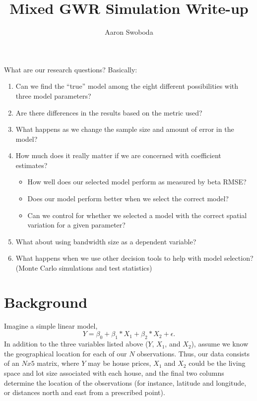 \documentclass{article}\usepackage[]{graphicx}\usepackage[]{color}
\title{Mixed GWR Simulation Write-up}
\author{Aaron Swoboda}
\begin{document}
\maketitle

What are our research questions? Basically:
\begin{enumerate}
\item Can we find the ``true'' model among the eight different possibilities with three model parameters?
\item Are there differences in the results based on the metric used?
\item What happens as we change the sample size and amount of error in the model?
\item How much does it really matter if we are concerned with coefficient estimates?
  \begin{itemize}
  \item How well does our selected model perform as measured by beta RMSE?
  \item Does our model perform better when we select the correct model?
  \item Can we control for whether we selected a model with the correct spatial variation for a given parameter?
  \end{itemize}
\item What about using bandwidth size as a dependent variable?
\item What happens when we use other decision tools to help with model selection? (Monte Carlo simulations and test statistics)
\end{enumerate}




\section{Background}

Imagine a simple linear model,
\begin{equation}\label{eq:simpleOLS}
Y = \beta _0 + \beta _1 *X_1 + \beta _2 * X_2 + \epsilon .
\end{equation}
In addition to the three variables listed above ($Y$, $X_1$, and $X_2$), assume we know the geographical location for each of our $N$ observations. Thus, our data consists of an $N x 5$ matrix, where $Y$ may be house prices, $X_1$ and $X_2$ could be the living space and lot size associated with each house, and the final two columns determine the location of the observations (for instance, latitude and longitude, or distances north and east from a prescribed point).
\end{document}
